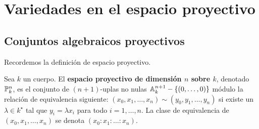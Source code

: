 \documentclass[ACGA.tex]{subfiles}
\begin{document}
%
%
%
%
%
%
%
%
%
%
%
%

\chapter{Variedades en el espacio proyectivo}

\section{Conjuntos algebraicos proyectivos}

Recordemos la definición de espacio proyectivo.

\begin{defi}
 Sea $k$ un cuerpo. El {\bf espacio proyectivo de dimensión $n$ sobre $k$}, denotado $\mathbb{P}^n_k$, es el conjunto de $(n+1)$-uplas no nulas $\mathbb{A}^{n+1}_k-\{(0,\ldots,0)\}$ módulo la relación de equivalencia siguiente: $(x_0,x_1,\ldots,x_n)\sim(y_0,y_1,\ldots,y_n)$ si existe un $\lambda\in k^\star$ tal que $y_i=\lambda x_i$ para todo $i=1,\ldots,n$. La clase de equivalencia de $(x_0,x_1,	\ldots,x_n)$ se denota $(x_0:x_1:\ldots:x_n)$.
\end{defi}
\end{document}
